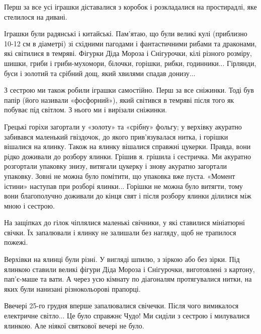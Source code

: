 Перш за все усі іграшки діставалися з коробок і розкладалися на простирадлі,
яке стелилося на дивані. 

Іграшки були радянські і китайські. Пам’ятаю, що були великі кулі (приблизно
10-12 см в діаметрі) зі східними пагодами і фантастичними рибами та драконами,
які світилися в темряві. Фігурки Діда Мороза і Снігурочки, кілі різного
розміру, шишки, гриби і гриби-мухомори, білочки, горішки, рибки, годинники...
Гірлянди, буси і золотий та срібний дощ, який хвилями спадав донизу... 

З сестрою ми також робили іграшки самостійно. Перш за все сніжинки. Тоді був
папір (його називали «фосфорний»), який світився в темряві після того як
побуває під світлом. З нього ми і вирізали сніжинки. 

Грецькі горіхи загортали у «золоту» та «срібну» фольгу; у верхівку акуратно
забивався маленький гвіздочок, до якого прив’язувалася нитка, і горішки
вішалися на ялинку. Також на ялинку вішалися справжні цукерки. Правда, вони
рідко доживали до розбору ялинки. Грішив я. грішила і сестричка. Ми акуратно
розгортали упаковку знизу, витягали цукерку і знову акуратно загортали
упаковку. Зовні не можна було помітити, що упаковка вже пуста. «Момент істини»
наступав при розборі ялинки... Горішки не можна було витягти, тому вони
благополучно доживали до кінця свят і після розбору ялинки ділилися між мною і
сестрою.


На защіпках до гілок чіплялися маленькі свічники, у які ставилися мініатюрні
свічки. Їх запалювали і ялинку не залишали без нагляду, щоб не трапилося
пожежі.


Верхівки на ялинці були різні. У вигляді шпилю, з зіркою або без зірки. Під
ялинкою ставили великі фігури Діда Мороза і Снігурочки, виготовлені з картону,
пап’є-маше та вати. А через усю кімнату по діагоналям протягувалися нитки, на
яких були нанизані різнокольорові прапорці.


Ввечері 25-го грудня вперше запалювалися свічечки. Після чого вимикалося
електричне світло... Це було справжнє Чудо! Ми сиділи з сестрою і милувалися
ялинкою. Але ніякої святкової вечері не було.


